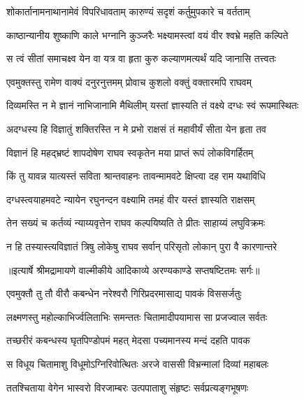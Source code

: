 \twolineshloka
{शोकार्तानामनाथानामेवं विपरिधावताम्}
{कारुण्यं सदृशं कर्तुमुपकारे च वर्तताम्} %

\twolineshloka
{काष्ठान्यानीय शुष्काणि काले भग्नानि कुञ्जरैः}
{भक्ष्यामस्त्वां वयं वीर श्वभ्रे महति कल्पिते} %

\twolineshloka
{स त्वं सीतां समाचक्ष्व येन वा यत्र वा हृता}
{कुरु कल्याणमत्यर्थं यदि जानासि तत्त्वतः} %

\twolineshloka
{एवमुक्तस्तु रामेण वाक्यं दनुरनुत्तमम्}
{प्रोवाच कुशलो वक्तुं वक्तारमपि राघवम्} %

\twolineshloka
{दिव्यमस्ति न मे ज्ञानं नाभिजानामि मैथिलीम्}
{यस्तां ज्ञास्यति तं वक्ष्ये दग्धः स्वं रूपमास्थितः} %

\twolineshloka
{अदग्धस्य हि विज्ञातुं शक्तिरस्ति न मे प्रभो}
{राक्षसं तं महावीर्यं सीता येन हृता तव} %

\twolineshloka
{विज्ञानं हि महद्भ्रष्टं शापदोषेण राघव}
{स्वकृतेन मया प्राप्तं रूपं लोकविगर्हितम्} %

\twolineshloka
{किं तु यावन्न यात्यस्तं सविता श्रान्तवाहनः}
{तावन्मामवटे क्षिप्त्वा दह राम यथाविधि} %

\twolineshloka
{दग्धस्त्वयाहमवटे न्यायेन रघुनन्दन}
{वक्ष्यामि तमहं वीर यस्तं ज्ञास्यति राक्षसम्} %

\twolineshloka
{तेन सख्यं च कर्तव्यं न्याय्यवृत्तेन राघव}
{कल्पयिष्यति ते प्रीतः साहाय्यं लघुविक्रमः} %

\twolineshloka
{न हि तस्यास्त्यविज्ञातं त्रिषु लोकेषु राघव}
{सर्वान् परिसृतो लोकान् पुरा वै कारणान्तरे} %


{॥इत्यार्षे श्रीमद्रामायणे वाल्मीकीये आदिकाव्ये अरण्यकाण्डे सप्तषष्टितमः सर्गः॥}


\twolineshloka
{एवमुक्तौ तु तौ वीरौ कबन्धेन नरेश्वरौ}
{गिरिप्रदरमासाद्य पावकं विससर्जतुः} %

\twolineshloka
{लक्ष्मणस्तु महोल्काभिर्ज्वलिताभिः समन्ततः}
{चितामादीपयामास सा प्रजज्वाल सर्वतः} %

\twolineshloka
{तच्छरीरं कबन्धस्य घृतपिण्डोपमं महत्}
{मेदसा पच्यमानस्य मन्दं दहति पावक} %

\twolineshloka
{स विधूय चितामाशु विधूमोऽग्निरिवोत्थितः}
{अरजे वाससी विभ्रन्मालां दिव्यां महाबलः} %

\twolineshloka
{ततश्चिताया वेगेन भास्वरो विरजाम्बरः}
{उत्पपाताशु संहृष्टः सर्वप्रत्यङ्गभूषणः} %


